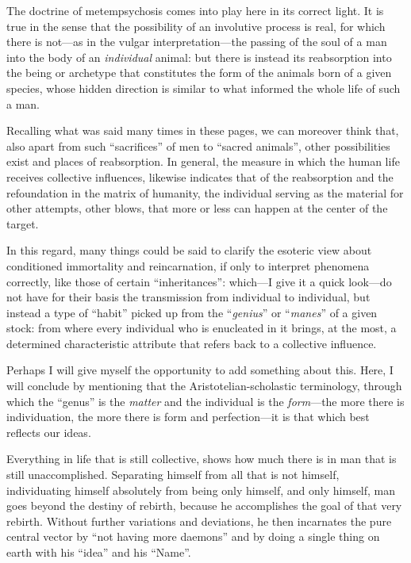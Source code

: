 The doctrine of metempsychosis comes into play here in its correct light. It is true in the sense that the possibility of an involutive process is real, for which there is not---as in the vulgar interpretation---the passing of the soul of a man into the body of an \emph{individual} animal: but there is instead its reabsorption into the being or archetype that constitutes the form of the animals born of a given species, whose hidden direction is similar to what informed the whole life of such a man.

Recalling what was said many times in these pages, we can moreover think that, also apart from such ``sacrifices'' of men to ``sacred animals'', other possibilities exist and places of reabsorption. In general, the measure in which the human life receives collective influences, likewise indicates that of the reabsorption and the refoundation in the matrix of humanity, the individual serving as the material for other attempts, other blows, that more or less can happen at the center of the target.

In this regard, many things could be said to clarify the esoteric view about conditioned immortality and reincarnation, if only to interpret phenomena correctly, like those of certain ``inheritances'': which---I give it a quick look---do not have for their basis the transmission from individual to individual, but instead a type of ``habit'' picked up from the ``\emph{genius}'' or ``\emph{manes}'' of a given stock: from where every individual who is enucleated in it brings, at the most, a determined characteristic attribute that refers back to a collective influence.

Perhaps I will give myself the opportunity to add something about this. Here, I will conclude by mentioning that the Aristotelian-scholastic terminology, through which the ``genus'' is the \emph{matter} and the individual is the \emph{form}---the more there is individuation, the more there is form and perfection---it is that which best reflects our ideas.

Everything in life that is still collective, shows how much there is in man that is still unaccomplished. Separating himself from all that is not himself, individuating himself absolutely from being only himself, and only himself, man goes beyond the destiny of rebirth, because he accomplishes the goal of that very rebirth. Without further variations and deviations, he then incarnates the pure central vector by ``not having more daemons'' and by doing a single thing on earth with his ``idea'' and his ``Name''.

